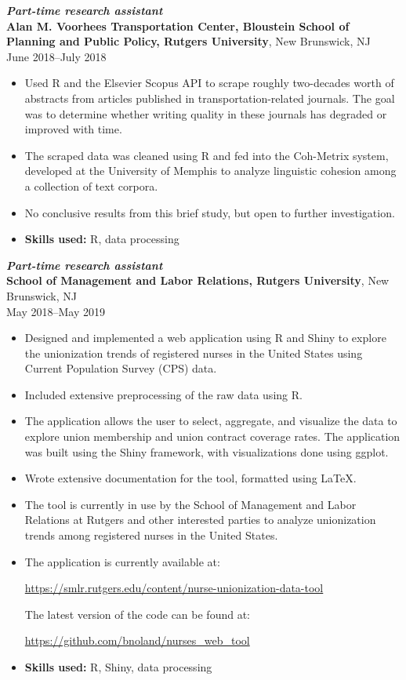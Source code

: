 \documentclass[letterpaper,12pt]{article}
\begin{document}
\textit{\textbf{Part-time research assistant}} \\
\textbf{Alan M. Voorhees Transportation Center, Bloustein School of
  Planning and Public Policy, Rutgers University},
New Brunswick, NJ \\
June 2018--July 2018
\begin{itemize}
\item Used R and the Elsevier Scopus API to scrape roughly two-decades
  worth of abstracts from articles published in transportation-related
  journals. The goal was to determine whether writing quality in these
  journals has degraded or improved with time.
\item The scraped data was cleaned using R and fed into the Coh-Metrix
  system, developed at the University of Memphis to analyze linguistic
  cohesion among a collection of text corpora.
\item No conclusive results from this brief study, but open to further
  investigation.
\item \textbf{Skills used:} R, data processing
\end{itemize}

\textit{\textbf{Part-time research assistant}} \\
\textbf{School of Management and Labor Relations, Rutgers University},
New Brunswick, NJ \\
May 2018--May 2019
\begin{itemize}
\item Designed and implemented a web application using R and Shiny to
  explore the unionization trends of registered nurses in the United
  States using Current Population Survey (CPS) data.
\item Included extensive preprocessing of the raw data using R.
\item The application allows the user to select, aggregate, and
  visualize the data to explore union membership and union contract
  coverage rates. The application was built using the Shiny framework,
  with visualizations done using ggplot.
\item Wrote extensive documentation for the tool, formatted using
  \LaTeX.
\item The tool is currently in use by the School of Management and
  Labor Relations at Rutgers and other interested parties to analyze
  unionization trends among registered nurses in the United States.
\item The application is currently available at:
  \begin{center}
    \url{https://smlr.rutgers.edu/content/nurse-unionization-data-tool}
  \end{center}
  The latest version of the code can be found at:
  \begin{center}
    \url{https://github.com/bnoland/nurses_web_tool}
  \end{center}
\item \textbf{Skills used:} R, Shiny, data processing
\end{itemize}
\end{document}
